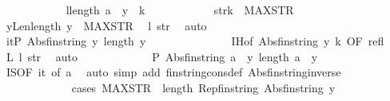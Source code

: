 \begin{isabellebody}
\ \ \ \ \ \ \ \ \ \ \isamarkupfalse%
\ l{\isacharcolon}{\isachardoublequoteopen}length\ {\isacharparenleft}a\ {\isacharhash}\ y{\isacharparenright}\ {\isacharequal}\ k{\isachardoublequoteclose}\isanewline
\ \ \ \ \ \ \ \ \ \ \isamarkupfalse%
\ str{\isacharcolon}{\isachardoublequoteopen}k\ {\isasymle}\ MAX{\isacharunderscore}STR{\isachardoublequoteclose}\isanewline
\ \ \ \ \ \ \ \ \ \ \isamarkupfalse%
\ yLen{\isacharcolon}{\isachardoublequoteopen}length\ y\ {\isacharless}\ MAX{\isacharunderscore}STR{\isachardoublequoteclose}\ \isamarkupfalse%
\ l\ str\ \isamarkupfalse%
\ auto\isanewline
\ \ \ \ \ \ \ \ \ \ \isamarkupfalse%
\ it{\isacharcolon}{\isachardoublequoteopen}P\ {\isacharparenleft}Abs{\isacharunderscore}fin{\isacharunderscore}string\ y{\isacharparenright}\ {\isacharparenleft}length\ y{\isacharparenright}{\isachardoublequoteclose}\ \isanewline
\ \ \ \ \ \ \ \ \ \ \ \ \isamarkupfalse%
\ IH{\isacharbrackleft}of\ {\isachardoublequoteopen}Abs{\isacharunderscore}fin{\isacharunderscore}string\ y{\isachardoublequoteclose}\ {\isachardoublequoteopen}k{\isacharminus}{}{\isachardoublequoteclose}{\isacharcomma}\ OF\ refl{\isacharbrackright}\ \isamarkupfalse%
\ L\ l\ str\ \isamarkupfalse%
\ auto\isanewline
\ \ \ \ \ \ \ \ \ \ \isamarkupfalse%
\ \ {\isachardoublequoteopen}P\ {\isacharparenleft}Abs{\isacharunderscore}fin{\isacharunderscore}string\ {\isacharparenleft}a\ {\isacharhash}\ y{\isacharparenright}{\isacharparenright}\ {\isacharparenleft}length\ {\isacharparenleft}a\ {\isacharhash}\ y{\isacharparenright}{\isacharparenright}{\isachardoublequoteclose}\isanewline
\ \ \ \ \ \ \ \ \ \ \ \ \isamarkupfalse%
\ IS{\isacharbrackleft}OF\ it{\isacharcomma}\ of\ a{\isacharbrackright}\ \isamarkupfalse%
\ {\isacharparenleft}auto\ simp\ add{\isacharcolon}\ fin{\isacharunderscore}string{\isacharunderscore}cons{\isacharunderscore}def\ Abs{\isacharunderscore}fin{\isacharunderscore}string{\isacharunderscore}inverse{\isacharparenright}\isanewline
\ \ \ \ \ \ \ \ \ \ \ \ \isamarkupfalse%
{\isacharparenleft}cases\ {\isachardoublequoteopen}MAX{\isacharunderscore}STR\ {\isasymle}\ length\ {\isacharparenleft}Rep{\isacharunderscore}fin{\isacharunderscore}string\ {\isacharparenleft}Abs{\isacharunderscore}fin{\isacharunderscore}string\ y{\isacharparenright}{\isacharparenright}{\isachardoublequoteclose}{\isacharparenright}\isanewline
\ \ \ \ \ \ \ \ \ \ \ \ \isamarkupfalse%

\end{isabellebody}
